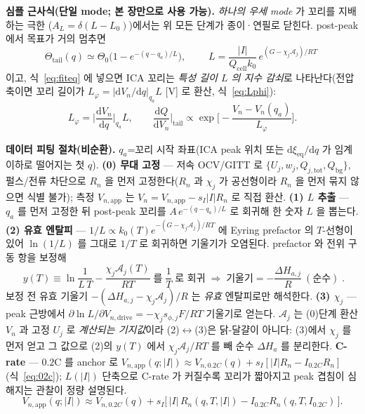 \documentclass[11pt,a4paper]{article}
\newcommand{\dd}{\mathrm{d}}
\newcommand{\eq}{\mathrm{eq}}
\newcommand{\app}{\mathrm{app}}
\newcommand{\drive}{\mathrm{drive}}
\newcommand{\bg}{\mathrm{bg}}
\newcommand{\cell}{\mathrm{cell}}
\newcommand{\tot}{\mathrm{tot}}
\begin{document}
\textbf{심플 근사식(단일 mode; 본 장만으로 사용 가능).} \emph{하나의 우세 mode} 가 꼬리를 지배하는 극한
($A_L=\delta(L-L_0)$)에서는 위 모든 단계가 종이·연필로 닫힌다. post-peak 에서 목표가 거의 멈추면
\begin{equation}
\Theta_\mathrm{tail}(q)\simeq\Theta_0\big(1-e^{-(q-q_a)/L}\big),\qquad
\boxed{\;L=\frac{|I|}{Q_\cell k_0}\,e^{(G-\chi_j\mathcal A_j)/RT}\;}
\label{eq:simplefit}
\end{equation}
이고, 식~\eqref{eq:fiteq} 에 넣으면 ICA 꼬리는 \emph{특성 길이 $L$ 의 지수 감쇠}로 나타난다(전압축이면 꼬리 길이가
$L_\varphi=|\dd V_n/\dd q|_{q_a}L$ [V] 로 환산, 식~\eqref{eq:Lphi}):
\begin{equation}
L_\varphi=\Big|\frac{\dd V_n}{\dd q}\Big|_{q_a}\!\!L,\qquad
\frac{\dd Q}{\dd V_n}\Big|_{\mathrm{tail}}\propto\exp\!\Big[-\frac{V_n-V_n(q_a)}{L_\varphi}\Big].
\label{eq:Lphi}
\end{equation}

\textbf{데이터 피팅 절차(비순환).} $q_a$=꼬리 시작 좌표(ICA peak 위치 또는 $\dd\xi_\eq/\dd q$ 가 임계 이하로
떨어지는 첫 $q$). \textbf{(0) 무대 고정} — 저속 OCV/GITT 로 $\{U_j,w_j,Q_{j,\tot},Q_\bg\}$, 펄스/전류 차단으로
$R_n$ 을 먼저 고정한다($R_n$ 과 $\chi_j$ 가 공선형이라 $R_n$ 을 먼저 묶지 않으면 식별 불가); 측정 $V_{n,\app}$ 는
$V_n=V_{n,\app}-s_I|I|R_n$ 로 직접 환산. \textbf{(1) $L$ 추출} — $q_a$ 를 먼저 고정한 뒤 post-peak 꼬리를
$A\,e^{-(q-q_a)/L}$ 로 회귀해 한 숫자 $L$ 을 뽑는다. \textbf{(2) 유효 엔탈피} — $1/L\propto k_0(T)e^{-(G-\chi_j
\mathcal A_j)/RT}$ 에 Eyring prefactor 의 $T$-선형이 있어 $\ln(1/L)$ 를 그대로 $1/T$ 로 회귀하면 기울기가
오염된다. prefactor 와 전위 구동 항을 보정해
\begin{equation}
\boxed{\;y(T)\equiv\ln\frac1{L\,T}-\frac{\chi_j\mathcal A_j(T)}{RT}\;\text{를}\;\frac1T\;\text{로 회귀}
\;\Longrightarrow\;\text{기울기}=-\frac{\Delta H_{a,j}}{R}\ (\text{순수})\;.}
\label{eq:eyring_corrected}
\end{equation}
보정 전 유효 기울기 $-(\Delta H_{a,j}-\chi_j\mathcal A_j)/R$ 는 \emph{유효} 엔탈피로만 해석한다. \textbf{(3)
$\chi_j$} — peak 근방에서 $\partial\ln L/\partial V_{n,\drive}=-\chi_j s_{\phi,j}F/RT$ 기울기로 얻는다.
$\mathcal A_j$ 는 (0)단계 환산 $V_n$ 과 고정 $U_j$ 로 \emph{계산되는 기지값}이라 (2)$\leftrightarrow$(3)은
닭-달걀이 아니다: (3)에서 $\chi_j$ 를 먼저 얻고 그 값으로 (2)의 $y(T)$ 에서 $\chi_j\mathcal A_j/RT$ 를 빼
순수 $\Delta H_a$ 를 분리한다. \textbf{C-rate} — $0.2$C 를 anchor 로 $V_{n,\app}(q;|I|)\approx V_{n,0.2C}(q)
+s_I[|I|R_n-I_{0.2C}R_n]$(식~\eqref{eq:02c}); $L(|I|)$ 단축으로 C-rate 가 커질수록 꼬리가 짧아지고 peak 겹침이
심해지는 관찰이 정량 설명된다.
\begin{equation}
V_{n,\app}(q;|I|)\approx V_{n,0.2C}(q)+s_I\big[\,|I|\,R_n(q,T,|I|)-I_{0.2C}R_n(q,T,I_{0.2C})\,\big].
\label{eq:02c}
\end{equation}
\end{document}
